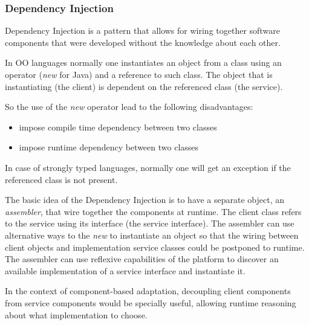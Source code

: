 \subsubsection{Dependency Injection}

Dependency Injection is a pattern that allows for wiring together software components that were developed without the knowledge about each other.~\cite{fowler_inversion_2004}

In OO languages normally one instantiates an object from a class using an operator (\emph{new} for Java) and a reference to such class.
The object that is instantiating (the client) is dependent on the referenced class (the service).

So the use of the \emph{new} operator lead to the following disadvantages:
\begin{itemize}
  \item impose compile time dependency between two classes
  \item impose runtime dependency between two classes
\end{itemize}

In case of strongly typed languages, normally one will get an exception if the referenced class is not present.

The basic idea of the Dependency Injection is to have a separate object, an \emph{assembler}, that wire together the components at runtime\cite{fowler_inversion_2004}. The client class refers to the service using its interface (the service interface). The assembler can use alternative ways to the \emph{new} to instantiate an object so that the wiring between client objects and implementation service classes could be postponed to runtime.
The assembler can use reflexive capabilities of the platform to discover an available implementation of a service interface and instantiate it.

In the context of component-based adaptation, decoupling client components from service components would be specially useful, allowing runtime reasoning about what implementation to choose.
%
%
%

%
